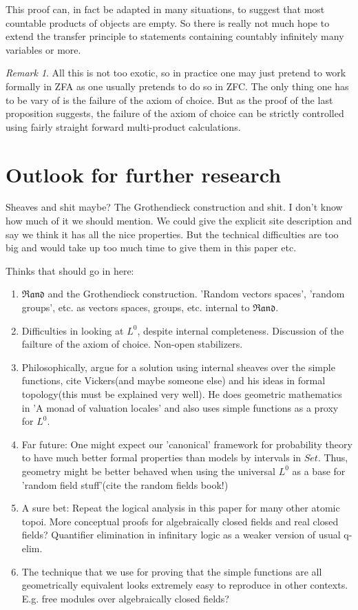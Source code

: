 \documentclass[a4paper]{amsproc}
\theoremstyle{plain}
\theoremstyle{definition}
\theoremstyle{remark}
\newtheorem{remark}[theorem]{Remark}
\numberwithin{equation}{section}
\begin{document}
This proof can, in fact be adapted in many situations, to suggest that most countable products of objects are empty. So there is really not much hope to extend the transfer principle to statements containing countably infinitely many variables or more.
\begin{remark} All this is not too exotic, so in practice one may just pretend to work formally in ZFA as one usually pretends to do so in ZFC. The only thing one has to be vary of is the failure of the axiom of choice. But as the proof of the last proposition suggests, the failure of the axiom of choice can be strictly controlled using fairly straight forward multi-product calculations.
\end{remark}


\section{Outlook for further research}

Sheaves and shit maybe? The Grothendieck construction and shit. I don't know how much of it we should mention. We could give the explicit site description and say we think it has all the nice properties. But the technical difficulties are too big and would take up too much time to give them in this paper etc.

Thinks that should go in here:
\begin{enumerate}
    \item $\mathfrak{Rand}$ and the Grothendieck construction. 'Random vectors spaces', 'random groups', etc. as vectors spaces, groups, etc. internal to $\mathfrak{Rand}$.
    \item Difficulties in looking at $L^0$, despite internal completeness. Discussion of the failture of the axiom of choice. Non-open stabilizers.
    \item Philosophically, argue for a solution using internal sheaves over the simple functions, cite Vickers(and maybe someone else) and his ideas in formal topology(this must be explained very well). He does geometric mathematics in 'A monad of valuation locales' and also uses simple functions as a proxy for $L^0$.
    \item Far future: One might expect our 'canonical' framework for probability theory to have much better formal properties than models by intervals in $Set$. Thus, geometry might be better behaved when using the universal $L^0$ as a base for 'random field stuff'(cite the random fields book!)
    \item A sure bet: Repeat the logical analysis in this paper for many other atomic topoi. More conceptual proofs for algebraically closed fields and real closed fields? Quantifier elimination in infinitary logic as a weaker version of usual q-elim.
    \item The technique that we use for proving that the simple functions are all geometrically equivalent looks extremely easy to reproduce in other contexts. E.g. free modules over algebraically closed fields?
\end{enumerate}
\end{document}

